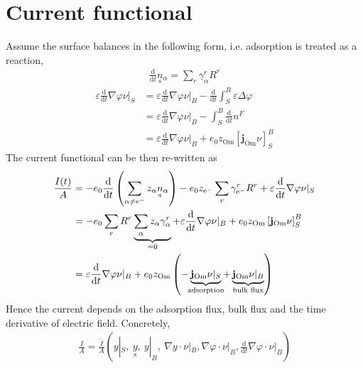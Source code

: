 \documentclass[a4 paper]{article}
\newcommand\Om{\mathrm{Om}}
\newcommand\eM{\mathrm{e^-}}
\newcommand{\dd}{\mathrm{d}}
\newcommand{\us}[1]{\underset{\textrm{s}}{#1}{}}
\begin{document}
\section{Current functional}
Assume the surface balances in the following form, i.e. adsorption is treated as a reaction,
\begin{align}
    \frac{\dd}{\dd t}\us n_\alpha = \sum_r \gamma^r_\alpha R^r 
    \label{}
\end{align}
\begin{align}
    \varepsilon\frac{\dd}{\dd t}\nabla\varphi\nu|_S 
    &= \varepsilon\frac{\dd}{\dd t}\nabla\varphi\nu|_B - \frac{\dd}{\dd t}\int_S^B \varepsilon \Delta \varphi\\
    &= \varepsilon\frac{\dd}{\dd t}\nabla\varphi\nu|_B - \int_S^B \frac{\dd}{\dd t} n^F\\
    &= \varepsilon\frac{\dd}{\dd t}\nabla\varphi\nu|_B + e_0 z_\Om\left[\mathbf{j}_\Om\nu\right]_S^B
    \label{}
\end{align}
The current functional can be then re-written as
\begin{align}
    \frac{I(t)}{A} &=  - e_0\frac{\dd}{\dd t}\left( 
                                                  \sum_{\alpha\neq\eM} z_\alpha\us n_\alpha
                                              \right) 
                       - e_0 z_{\eM}\sum_r \gamma^r_{\eM}R^r 
                      + \varepsilon\frac{\dd}{\dd t}\nabla\varphi\nu|_S\\
                   &= - e_0\sum_r R^r \underbrace{\sum_\alpha z_\alpha \gamma^r_\alpha}_{=0} 
                      +\varepsilon\frac{\dd}{\dd t}\nabla\varphi\nu|_B 
                      + e_0 z_\Om\left[\mathbf{j}_\Om\nu\right]_S^B\\
                   &= \varepsilon\frac{\dd}{\dd t}\nabla\varphi\nu|_B 
                   +e_0 z_\Om\left(%
                       - \underbrace{\mathbf{j}_\Om\nu|_S}_{\mathclap{\text{adsorption}}}
                       + \underbrace{\mathbf{j}_\Om\nu|_B}_{\mathclap{\text{bulk flux}}}
                   \right)
    \label{}
\end{align}
Hence the current depends on the adsorption flux, bulk flux and the time derivative of electric field.
Concretely, 
\begin{align}
    \frac{I}{A} = \frac{\widetilde{I}}{A}\left(
                      y|_S,\
                      \us y,\
                      y|_B,\
                      \nabla y\cdot \nu|_B,
                      \nabla \varphi\cdot \nu|_B,
                      \frac{\dd}{\dd t}\nabla \varphi\cdot \nu|_B
                  \right)
    \label{}
\end{align}
\end{document}
